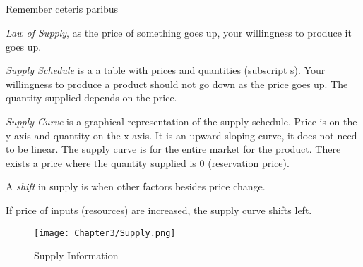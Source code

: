 \subsection{}

Remember ceteris paribus
\begin{definition}
    \emph{Law of Supply}, as the price of something goes up, your willingness to produce it goes up.
\end{definition}
\begin{definition}
    \emph{Supply Schedule} is a a table with prices and quantities (subscript s). Your willingness to produce
    a product should not go down as the price goes up. The quantity supplied depends on the price.
\end{definition}
\begin{definition}
    \emph{Supply Curve} is a graphical representation of the supply schedule. Price is on the y-axis and quantity on the x-axis.
    It is an upward sloping curve, it does not need to be linear. The supply curve is for the entire market for the product. 
    There exists a price where the quantity supplied is 0 (reservation price).
\end{definition}
\begin{definition}
    A \emph{shift} in supply is when other factors besides price change.
\end{definition}
\begin{example}
    If price of inputs (resources) are increased, the supply curve shifts left.
\end{example}
\begin{figure}[h!]
    \centering
    \texttt{[image: Chapter3/Supply.png]}
    \caption{Supply Information}
\end{figure}